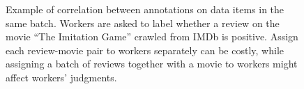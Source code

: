 \begin{figure}[!t]
{\begin{tabular}{@{}c@{}}
    \end{tabular}
  }
  \caption{\label{fig:example}
  Example of correlation between annotations on data items in the same batch.
  Workers are asked to label whether a review on the movie ``The Imitation Game'' crawled from IMDb is positive.
  Assign each review-movie pair to workers separately can be costly,
  while assigning a batch of reviews together with a movie to workers might affect workers' judgments.
  }
\end{figure}





